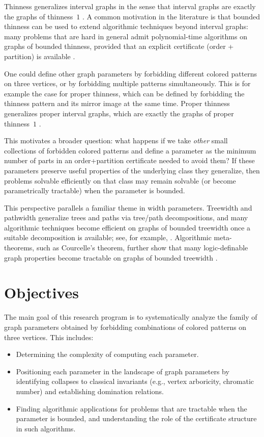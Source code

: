 \documentclass[11pt]{article}
\theoremstyle{definition}
\theoremstyle{plain}
\theoremstyle{remark}
\begin{document}
Thinness generalizes interval graphs in the sense that interval graphs are exactly the graphs of thinness~$1$ \cite{Mannino2007}.
A common motivation in the literature is that bounded thinness can be used to extend algorithmic techniques beyond interval graphs:
many problems that are hard in general admit polynomial-time algorithms on graphs of bounded thinness, provided that an explicit certificate (order + partition) is available \cite{BonomoDeEstrada2019}.

One could define other graph parameters by forbidding different colored patterns on three vertices, or by forbidding multiple patterns simultaneously. This is for example the case for proper thinness, which can be defined by forbidding the thinness pattern and its mirror image at the same time. Proper thinness generalizes proper interval graphs, which are exactly the graphs of proper thinness~$1$ \cite{BonomoDeEstrada2019}.

This motivates a broader question: what happens if we take \emph{other} small collections of forbidden colored patterns
and define a parameter as the minimum number of parts in an order+partition certificate needed to avoid them?
If these parameters preserve useful properties of the underlying class they generalize,
then problems solvable efficiently on that class may remain solvable (or become parametrically tractable)
when the parameter is bounded.

This perspective parallels a familiar theme in width parameters. Treewidth and pathwidth generalize trees and paths via
tree/path decompositions, and many algorithmic techniques become efficient on graphs of bounded treewidth once a suitable
decomposition is available; see, for example, \textcite{Bodlaender1993}.
Algorithmic meta-theorems, such as Courcelle's theorem, further show that many logic-definable graph properties become tractable
on graphs of bounded treewidth \cite{Courcelle1990}.




\section{Objectives}
The main goal of this research program is to systematically analyze the family of graph parameters obtained by forbidding combinations of colored patterns on three vertices. This includes:
\begin{itemize}
  \item Determining the complexity of computing each parameter.
  \item Positioning each parameter in the landscape of graph parameters by identifying collapses to classical invariants (e.g., vertex arboricity, chromatic number) and establishing domination relations.
  \item Finding algorithmic applications for problems that are tractable when the parameter is bounded, and understanding the role of the certificate structure in such algorithms.
\end{itemize}
\end{document}
